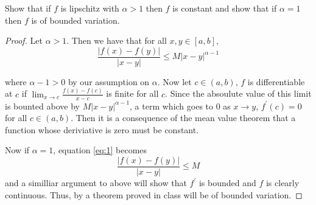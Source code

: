 \documentclass[11pt,largemargins]{homework}
\begin{document}
 

\question 
Show that if $f$ is lipschitz with $\alpha > 1$ then 
$f$ is constant and show that if $\alpha = 1$ then 
$f$ is of bounded variation. 

\begin{proof} 
Let $\alpha >1$. Then  we have that for all $x, y \in [a, b]$, 
\begin{equation} 
\label{eq:1}
\frac{|f(x) - f(y)|}{|x-y|} \leq M|x - y|^{\alpha -1}
\end{equation}

where $\alpha - 1 > 0$ by our assumption on $\alpha$. Now let $c \in (a, b)$, 
$f$ is differentiable at $c$ if $\lim_{x \to c} \frac{f(x) - f(c)}{x- c} $ is finite for all $c$. 
Since the absoulute value of this limit is bounted above by $M|x - y|^{\alpha -1}$, a term which goes to 0 as $x \to y$, 
$f^\prime (c) = 0$ for all $c \in (a, b)$. Then it is a consequence of the mean value theorem that a function whose deriviative is zero must 
be constant. 

Now if $\alpha = 1$, equation \ref{eq:1} becomes 
\[ \frac{|f(x) - f(y)|}{|x-y|} \leq M \]
and a similliar argument to above will show that $f^\prime$ is bounded and $f$ is clearly continuous. Thus, by a theorem proved in class will be of bounded variation. 

\end{proof}

\question 
\end{document}
